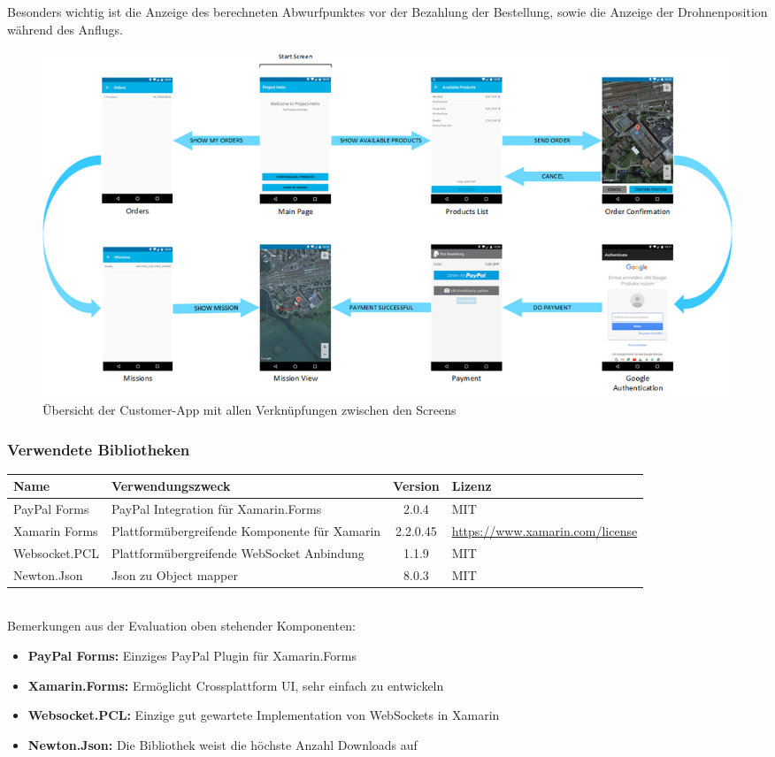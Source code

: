 Besonders wichtig ist die Anzeige des berechneten Abwurfpunktes vor der Bezahlung der Bestellung, sowie die Anzeige der Drohnenposition während des Anflugs.  

\begin{landscape}
	\begin{figure}[h]
		\centering
		\includegraphics[width=0.8\paperheight] {images/customer-app-pages.png}
		\caption{Übersicht der Customer-App mit allen Verknüpfungen zwischen den Screens}
		\label{fig:customer-app-flow}
	\end{figure}
\end{landscape}

\subsubsection{Verwendete Bibliotheken}
\begin{tabularx}{\textwidth}{|X|X|c|X|}
	\hline
	\textbf{Name} & \textbf{Verwendungszweck} & \textbf{Version} & \textbf{Lizenz} \\
	\hline \hline
	PayPal Forms & PayPal Integration für Xamarin.Forms & 2.0.4 & MIT \\
	\hline 
	Xamarin Forms & Plattformübergreifende Komponente für Xamarin & 2.2.0.45 & \url{https://www.xamarin.com/license} \\
	\hline 
	Websocket.PCL & Plattformübergreifende WebSocket Anbindung & 1.1.9 & MIT \\
	\hline 
	Newton.Json & Json zu Object mapper & 8.0.3 & MIT \\
	\hline 
\end{tabularx}\\

Bemerkungen aus der Evaluation oben stehender Komponenten:
\begin{itemize}
	\item{\textbf{PayPal Forms:} Einziges PayPal Plugin für Xamarin.Forms}
	\item{\textbf{Xamarin.Forms:} Ermöglicht Crossplattform UI, sehr einfach zu entwickeln}
	\item{\textbf{Websocket.PCL:} Einzige gut gewartete Implementation von WebSockets in Xamarin}
	\item{\textbf{Newton.Json:} Die Bibliothek weist die höchste Anzahl Downloads auf}
\end{itemize}

